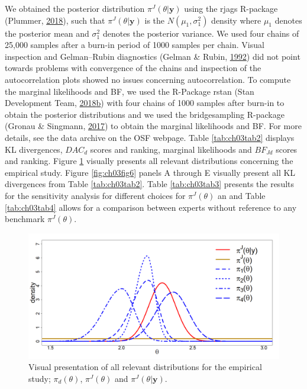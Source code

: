 \documentclass[openright,titlepage,12pt,a4paper]{book}
\begin{document}
We obtained the posterior distribution \(\pi^J(\theta|\textbf{y})\) using the rjags R-package (Plummer, \protect\hyperlink{ref-plummer_rjags:_2018}{2018}), such that \(\pi^J(\theta|\textbf{y})\) is the \(N(\mu_1,\sigma^2_1)\) density where \(\mu_1\) denotes the posterior mean and \(\sigma^2_1\) denotes the posterior variance. We used four chains of 25,000 samples after a burn-in period of 1000 samples per chain. Visual inspection and Gelman--Rubin diagnostics (Gelman \& Rubin, \protect\hyperlink{ref-gelman_inference_1992}{1992}) did not point towards problems with convergence of the chains and inspection of the autocorrelation plots showed no issues concerning autocorrelation. To compute the marginal likelihoods and BF, we used the R-Package rstan (Stan Development Team, \protect\hyperlink{ref-stan_development_team_rstan:_2018}{2018}\protect\hyperlink{ref-stan_development_team_rstan:_2018}{b}) with four chains of 1000 samples after burn-in to obtain the posterior distributions and we used the bridgesampling R-package (Gronau \& Singmann, \protect\hyperlink{ref-gronau_bridgesampling:_2017}{2017}) to obtain the marginal likelihoods and BF. For more details, see the data archive on the OSF webpage. Table \ref{tab:ch03tab2} displays KL divergences, \(DAC_d\) scores and ranking, marginal likelihoods and \(BF_{Jd}\) scores and ranking. Figure \ref{fig:ch03fig5} visually presents all relevant distributions concerning the empirical study. Figure \ref{fig:ch03fig6} panels A through E visually present all KL divergences from Table \ref{tab:ch03tab2}. Table \ref{tab:ch03tab3} presents the results for the sensitivity analysis for different choices for \(\pi^J(\theta)\) an and Table \ref{tab:ch03tab4} allows for a comparison between experts without reference to any benchmark \(\pi^J(\theta)\).

\begin{figure}

{\centering \includegraphics[width=0.9\linewidth]{figures/chapter_3/Figure5} 

}

\caption{Visual presentation of all relevant distributions for the empirical study; $\pi_d(\theta)$, $\pi^J(\theta)$ and $\pi^J(\theta|\textbf{y})$.}\label{fig:ch03fig5}
\end{figure}
\end{document}
